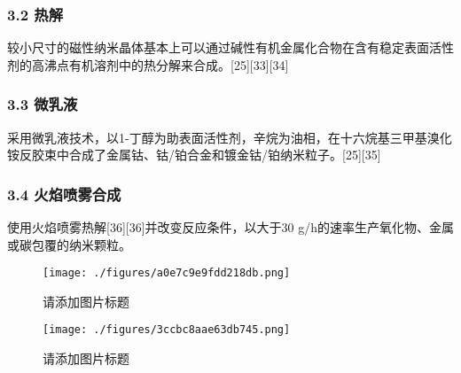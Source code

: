 \subsubsection{3.2 热解}
较小尺寸的磁性纳米晶体基本上可以通过碱性有机金属化合物在含有稳定表面活性剂的高沸点有机溶剂中的热分解来合成。[25][33][34]

\subsubsection{3.3 微乳液}
采用微乳液技术，以1-丁醇为助表面活性剂，辛烷为油相，在十六烷基三甲基溴化铵反胶束中合成了金属钴、钴/铂合金和镀金钴/铂纳米粒子。[25][35]

\subsubsection{3.4 火焰喷雾合成}
使用火焰喷雾热解[36][36]并改变反应条件，以大于30 g/h的速率生产氧化物、金属或碳包覆的纳米颗粒。
\begin{figure}[ht]
\centering
\texttt{[image: ./figures/a0e7c9e9fdd218db.png]}
\caption{请添加图片标题} \label{fig_CXNMLZ_3}
\end{figure}
\begin{figure}[ht]
\centering
\texttt{[image: ./figures/3ccbc8aae63db745.png]}
\caption{请添加图片标题} \label{fig_CXNMLZ_4}
\end{figure}
